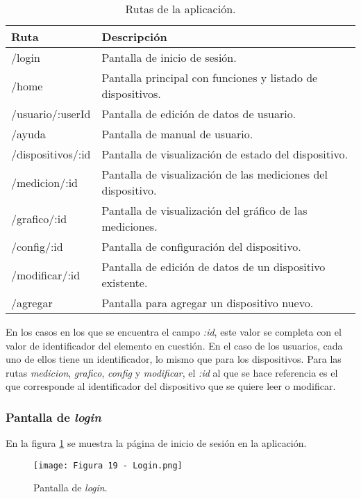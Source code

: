 \begin{table}[h]
\centering
\caption[Rutas de la aplicación]{Rutas de la aplicación.}
\begin{tabular}{l l}
\toprule
\textbf{Ruta} 			& \textbf{Descripción}\\
\midrule
/login					& Pantalla de inicio de sesión.\\
/home					& Pantalla principal con funciones y listado de dispositivos.\\
/usuario/:userId			& Pantalla de edición de datos de usuario.\\
/ayuda					& Pantalla de manual de usuario.\\
/dispositivos/:id		& Pantalla de visualización de estado del dispositivo.\\
/medicion/:id			& Pantalla de visualización de las mediciones del dispositivo.\\
/grafico/:id				& Pantalla de visualización del gráfico de las mediciones.\\
/config/:id				& Pantalla de configuración del dispositivo.\\
/modificar/:id			& Pantalla de edición de datos de un dispositivo existente.\\
/agregar					& Pantalla para agregar un dispositivo nuevo.\\
\bottomrule
\hline
\end{tabular}
\label{tab:rutas}
\end{table}

En los casos en los que se encuentra el campo \textit{:id}, este valor se completa con el valor de identificador del elemento en cuestión. En el caso de los usuarios, cada uno de ellos tiene un identificador, lo mismo que para los dispositivos. Para las rutas \textit{medicion}, \textit{grafico}, \textit{config} y \textit{modificar}, el \textit{:id} al que se hace referencia es el que corresponde al identificador del dispositivo que se quiere leer o modificar.

\subsubsection{Pantalla de \textit{login}}

En la figura \ref{fig:19} se muestra la página de inicio de sesión en la aplicación.

\begin{figure}[h]
\centering
\texttt{[image: Figura 19 - Login.png]}
\caption[Pantalla de login]{Pantalla de \textit{login}.}
\label{fig:19}
\end{figure}


